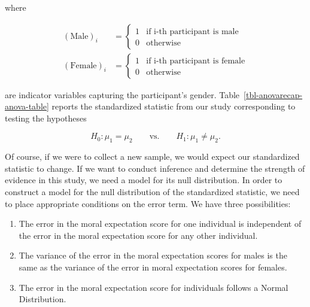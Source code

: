 \documentclass[
  letterpaper,
  DIV=11,
  numbers=noendperiod]{scrreprt}
\providecommand{\tightlist}{%
  \setlength{\itemsep}{0pt}\setlength{\parskip}{0pt}}\usepackage{longtable,booktabs,array}
\theoremstyle{plain}
\theoremstyle{definition}
\theoremstyle{definition}
\theoremstyle{remark}
\begin{document}
where

\[
\begin{aligned}
  (\text{Male})_i &= \begin{cases}
    1 & \text{if i-th participant is male} \\
    0 & \text{otherwise} 
    \end{cases} \\
  (\text{Female})_i &= \begin{cases}
    1 & \text{if i-th participant is female} \\
    0 & \text{otherwise}
    \end{cases}
\end{aligned}
\]

are indicator variables capturing the participant's gender.
Table~\ref{tbl-anovarecap-anova-table} reports the standardized
statistic from our study corresponding to testing the hypotheses

\[H_0: \mu_1 = \mu_2 \qquad \text{vs.} \qquad H_1: \mu_1 \neq \mu_2.\]

\begin{table}

\caption{\label{tbl-anovarecap-anova-table}ANOVA table summarizing the
comparison of the moral expectation score across gender within the
Organic Food Case Study.}


\end{table}%

Of course, if we were to collect a new sample, we would expect our
standardized statistic to change. If we want to conduct inference and
determine the strength of evidence in this study, we need a model for
its null distribution. In order to construct a model for the null
distribution of the standardized statistic, we need to place appropriate
conditions on the error term. We have three possibilities:

\begin{enumerate}
\def\labelenumi{\arabic{enumi}.}
\tightlist
\item
  The error in the moral expectation score for one individual is
  independent of the error in the moral expectation score for any other
  individual.
\item
  The variance of the error in the moral expectation scores for males is
  the same as the variance of the error in moral expectation scores for
  females.
\item
  The error in the moral expectation score for individuals follows a
  Normal Distribution.
\end{enumerate}
\end{document}

